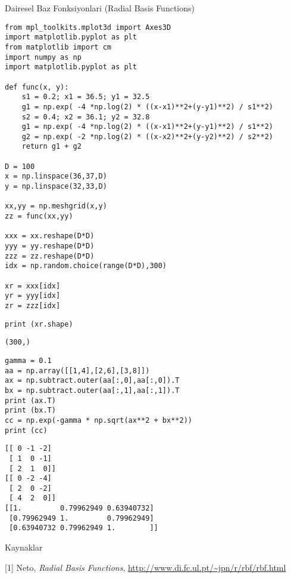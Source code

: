 \documentclass[12pt,fleqn]{article}\usepackage{../../common}
\begin{document}
Dairesel Baz Fonksiyonlari (Radial Basis Functions)

\begin{verbatim}
from mpl_toolkits.mplot3d import Axes3D
import matplotlib.pyplot as plt
from matplotlib import cm
import numpy as np
import matplotlib.pyplot as plt

def func(x, y):
    s1 = 0.2; x1 = 36.5; y1 = 32.5
    g1 = np.exp( -4 *np.log(2) * ((x-x1)**2+(y-y1)**2) / s1**2)
    s2 = 0.4; x2 = 36.1; y2 = 32.8
    g1 = np.exp( -4 *np.log(2) * ((x-x1)**2+(y-y1)**2) / s1**2)
    g2 = np.exp( -2 *np.log(2) * ((x-x2)**2+(y-y2)**2) / s2**2)
    return g1 + g2

D = 100
x = np.linspace(36,37,D)
y = np.linspace(32,33,D)

xx,yy = np.meshgrid(x,y)
zz = func(xx,yy)

xxx = xx.reshape(D*D)
yyy = yy.reshape(D*D)
zzz = zz.reshape(D*D)
idx = np.random.choice(range(D*D),300)

xr = xxx[idx]
yr = yyy[idx]
zr = zzz[idx]
\end{verbatim}

\begin{verbatim}
print (xr.shape)
\end{verbatim}

\begin{verbatim}
(300,)
\end{verbatim}


\begin{verbatim}
gamma = 0.1
aa = np.array([[1,4],[2,6],[3,8]])
ax = np.subtract.outer(aa[:,0],aa[:,0]).T
bx = np.subtract.outer(aa[:,1],aa[:,1]).T
print (ax.T)
print (bx.T)
cc = np.exp(-gamma * np.sqrt(ax**2 + bx**2))
print (cc)
\end{verbatim}

\begin{verbatim}
[[ 0 -1 -2]
 [ 1  0 -1]
 [ 2  1  0]]
[[ 0 -2 -4]
 [ 2  0 -2]
 [ 4  2  0]]
[[1.         0.79962949 0.63940732]
 [0.79962949 1.         0.79962949]
 [0.63940732 0.79962949 1.        ]]
\end{verbatim}














Kaynaklar

[1] Neto, {\em Radial Basis Functions}, \url{http://www.di.fc.ul.pt/~jpn/r/rbf/rbf.html}
\end{document}
